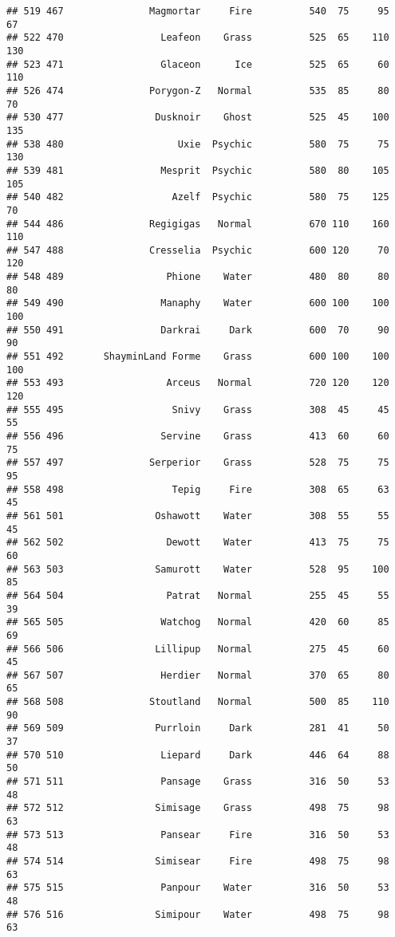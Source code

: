 \documentclass[
]{article}
\begin{document}
\begin{verbatim}
## 519 467               Magmortar     Fire          540  75     95      67
## 522 470                 Leafeon    Grass          525  65    110     130
## 523 471                 Glaceon      Ice          525  65     60     110
## 526 474               Porygon-Z   Normal          535  85     80      70
## 530 477                Dusknoir    Ghost          525  45    100     135
## 538 480                    Uxie  Psychic          580  75     75     130
## 539 481                 Mesprit  Psychic          580  80    105     105
## 540 482                   Azelf  Psychic          580  75    125      70
## 544 486               Regigigas   Normal          670 110    160     110
## 547 488               Cresselia  Psychic          600 120     70     120
## 548 489                  Phione    Water          480  80     80      80
## 549 490                 Manaphy    Water          600 100    100     100
## 550 491                 Darkrai     Dark          600  70     90      90
## 551 492       ShayminLand Forme    Grass          600 100    100     100
## 553 493                  Arceus   Normal          720 120    120     120
## 555 495                   Snivy    Grass          308  45     45      55
## 556 496                 Servine    Grass          413  60     60      75
## 557 497               Serperior    Grass          528  75     75      95
## 558 498                   Tepig     Fire          308  65     63      45
## 561 501                Oshawott    Water          308  55     55      45
## 562 502                  Dewott    Water          413  75     75      60
## 563 503                Samurott    Water          528  95    100      85
## 564 504                  Patrat   Normal          255  45     55      39
## 565 505                 Watchog   Normal          420  60     85      69
## 566 506                Lillipup   Normal          275  45     60      45
## 567 507                 Herdier   Normal          370  65     80      65
## 568 508               Stoutland   Normal          500  85    110      90
## 569 509                Purrloin     Dark          281  41     50      37
## 570 510                 Liepard     Dark          446  64     88      50
## 571 511                 Pansage    Grass          316  50     53      48
## 572 512                Simisage    Grass          498  75     98      63
## 573 513                 Pansear     Fire          316  50     53      48
## 574 514                Simisear     Fire          498  75     98      63
## 575 515                 Panpour    Water          316  50     53      48
## 576 516                Simipour    Water          498  75     98      63

\end{verbatim}
\end{document}

